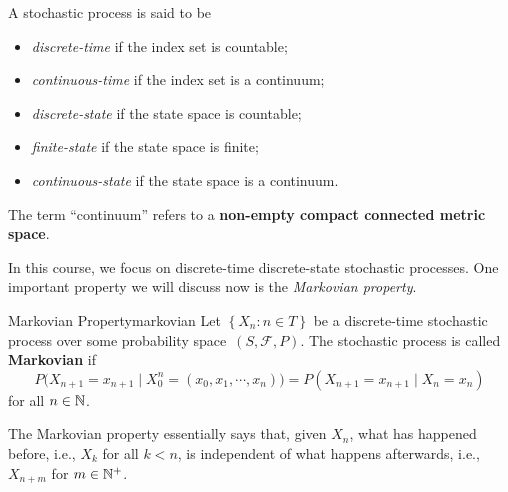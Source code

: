 \documentclass[math, code]{amznotes}
\theoremstyle{remark}
\begin{document}
A stochastic process is said to be 
\begin{itemize}
    \item \textit{discrete-time} if the index set is countable;
    \item \textit{continuous-time} if the index set is a continuum;
    \item \textit{discrete-state} if the state space is countable;
    \item \textit{finite-state} if the state space is finite;
    \item \textit{continuous-state} if the state space is a continuum.
\end{itemize}
The term ``continuum'' refers to a \textbf{non-empty compact connected metric space}. 

In this course, we focus on discrete-time discrete-state stochastic processes. One important property we will discuss now is the \textit{Markovian property}.
\begin{dfnbox}{Markovian Property}{markovian}
    Let $\left\{X_n \colon n \in T\right\}$ be a discrete-time stochastic process over some probability space~$\left(S, \mathcal{F}, P\right)$. The stochastic process is called {\color{red} \textbf{Markovian}} if 
    \begin{equation*}
        P\bigl(X_{n + 1} = x_{n + 1} \mid X_0^n = \left(x_0, x_1, \cdots, x_n\right)\bigr) = P\left(X_{n + 1} = x_{n + 1} \mid X_n = x_n\right)
    \end{equation*}
    for all $n \in \mathbb{N}$.
\end{dfnbox}
The Markovian property essentially says that, given $X_n$, what has happened before, i.e., $X_k$ for all $k < n$, is independent of what happens afterwards, i.e., $X_{n + m}$ for $m \in \mathbb{N}^+$.
\end{document}
